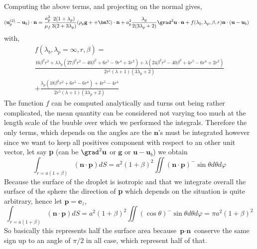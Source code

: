 Computing the above terms, and projecting on the normal gives, 
\begin{align}
    (\textbf{u}_p^{(2)} -\textbf{u}_b)\cdot \textbf{n}
    &=
    \frac{a_p^2}{\mu_f}
    \frac{2(1+\lambda_p)}{3(2+3\lambda_p)}( \rho_p\textbf{g}+ \div\bm\Sigma)\cdot\textbf{n}
    + a_p^2 \frac{\lambda_p}{2(3\lambda_p +2)} \grad^2 \textbf{u} \cdot\textbf{n}
    + f(\lambda_b,\lambda_p,\beta,r) \textbf{n}\cdot (\textbf{u} - \textbf{u}_b)
\end{align}
with, 
\begin{multline}
    f(\lambda_b,\lambda_p=\infty,r,\beta) =\\
    \frac{16 \beta^{2} r^{2} + \lambda \lambda_{p} \left(27 \beta^{2} r^{2} - 40 \beta^{2} + 6 r^{5} - 9 r^{4} + 3 r^{2}\right) + \lambda \left(24 \beta^{2} r^{2} - 40 \beta^{2} + 4 r^{5} - 6 r^{4} + 2 r^{2}\right)}{2 r^{5} \left(\lambda + 1\right) \left(3 \lambda_{p} + 2\right)}\\
    +
    \frac{ \lambda_{p} \left(18 \beta^{2} r^{2} + 6 r^{5} - 6 r^{4}\right) + 4 r^{5} - 4 r^{4}}{2 r^{5} \left(\lambda + 1\right) \left(3 \lambda_{p} + 2\right)}
\end{multline}
The function $f$ can be computed analytically and turns out being rather complicated, 
the mean quantity can be considered not varying too much at the length scale of the buuble over which we performed the integrals. 
Therefore the only terms, which depends on the angles are the $\textbf{n}$'s must be integrated however since we want to keep all positives component with respect to an other unit vector, let say \textbf{p} (can be $\grad^2 \textbf{u}$ or $\textbf{g}$ or $\textbf{u}-\textbf{u}_b$) we obtain 
\begin{equation}
    \int_{r=a(1+\beta)} (\textbf{n} \cdot \textbf{p})dS
    = a^2(1+\beta)^2
    \iint (\textbf{n} \cdot \textbf{p})^- \sin\theta d\theta d\varphi
\end{equation}
Because the surface of the droplet is isotropic and that we integrate overall the surface of the sphere the direction of \textbf{p} which depends on the situation is quite arbitrary, hence let $\textbf{p} = \textbf{e}_z$, 
\begin{equation}
    \int_{r=a(1+\beta)} (\textbf{n} \cdot \textbf{p})dS
    = a^2(1+\beta)^2
    \iint (\cos \theta)^- \sin\theta d\theta d\varphi
    = \pi a^2(1+\beta)^2
\end{equation}
So basically this represents half the surface area because $\textbf{p}\cdot \textbf{n}$ conserve the same sign up to an angle of $\pi/2$ in all case, which represent half of that. 


